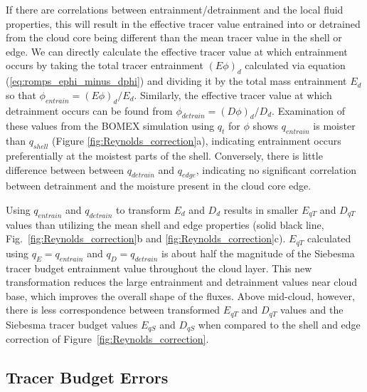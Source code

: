\documentclass[12pt]{article}
\begin{document}
If there are correlations between entrainment/detrainment and the local 
fluid properties, this will result in the effective tracer value 
entrained into or detrained from the cloud core being different than the 
mean tracer value in the shell or edge.  We can directly calculate the 
effective tracer value at which entrainment occurs by taking the total 
tracer entrainment $(E\phi)_d$ calculated via equation 
(\ref{eq:romps_ephi_minus_dphi}) and dividing it by the total mass
entrainment $E_d$ so that $\phi_{entrain} = (E\phi)_d / E_d$.  Similarly, 
the effective tracer value at which detrainment occurs can be found from  
$\phi_{detrain} = (D\phi)_d / D_d$.  Examination of these values from the 
BOMEX simulation using $q_t$ for $\phi$ shows $q_{entrain}$ is moister than 
$q_{shell}$ (Figure \ref{fig:Reynolds_correction}a), indicating entrainment
occurs preferentially at the moistest parts of the shell.  Conversely, 
there is little difference between between $q_{detrain}$ and $q_{edge}$,
indicating no significant correlation between detrainment and the moisture
present in the cloud core edge.

Using $q_{entrain}$ and $q_{detrain}$ to transform $E_d$ and $D_d$
results in smaller $E_{q T}$ and $D_{q T}$ values than utilizing the
mean shell and edge properties (solid black line,
Fig.~\ref{fig:Reynolds_correction}b and
\ref{fig:Reynolds_correction}c).  $E_{q T}$ calculated using $q_E =
q_{entrain}$ and $q_D = q_{detrain}$ is about half the magnitude of
the Siebesma tracer budget entrainment value throughout the cloud
layer.  This new transformation reduces the large entrainment and
detrainment values near cloud base, which improves the overall shape
of the fluxes. Above mid-cloud, however, there is less correspondence 
between transformed $E_{q T}$ and $D_{q T}$ values and the Siebesma
tracer budget values $E_{q S}$ and $D_{q S}$ when compared to the 
shell and edge correction of Figure~\ref{fig:Reynolds_correction}.


\subsection{Tracer Budget Errors}
\end{document}
